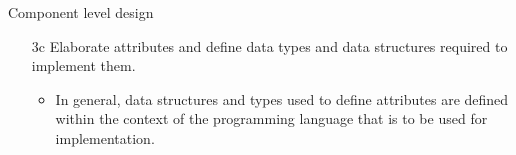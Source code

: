 \documentclass{beamer}
\begin{document}
\begin{frame}{Component level design}
	\begin{itemize}
		
		\item[3c] Elaborate attributes and define data types and data structures required to 
		implement them. 
		\begin{itemize}
			\item In general, data structures and types used to define attributes are
			defined within the context of the programming language that is to be used for 
			implementation.
		\end{itemize}
	\end{itemize}	

\end{frame}
\end{document}
